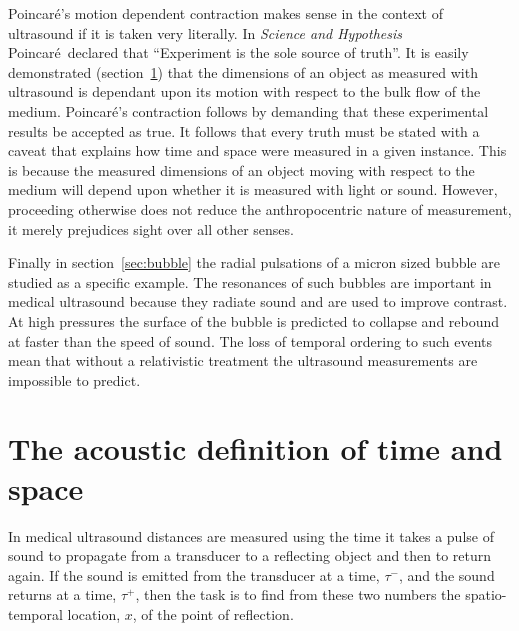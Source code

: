 \documentclass[10pt, fleqn,draft,showtrims,oldfontcommands]{article} %
\newcommand{\secref}[1]{section~\ref{sec:#1}}
\newcommand{\tm}{\tau^-}
\newcommand{\tp}{\tau^+}
\newcommand{\aetherial}{\ae therial}
\newcommand{\Poincare}{Poincar{\'e}}
\begin{document}
\Poincare's motion dependent contraction makes sense in the context of ultrasound if it is taken very literally.
In {\em Science and Hypothesis}\cite{Poincare1902} \Poincare\ declared that ``Experiment is the sole source of truth''.
It is easily demonstrated (\secref{measurement}) that the dimensions of an object as  measured with  ultrasound 
is dependant upon its motion with respect to the bulk flow of the medium.
\Poincare's contraction follows by  demanding that these experimental results be accepted as true.
It follows that  every truth  must be stated with a caveat that explains how time and space were  measured in a given instance.
This is because the measured dimensions of an object moving with respect to the medium  will depend upon whether it is measured with light or sound.
However, proceeding otherwise does not reduce the anthropocentric nature of measurement, it merely prejudices sight over all other senses.





Finally in section~\ref{sec:bubble} the radial pulsations of a micron sized bubble are studied as a specific example.
The resonances of such bubbles are important in medical ultrasound because they  radiate sound
and are used to improve contrast.
At high pressures the surface of the bubble is predicted to collapse and rebound at faster than the speed of sound.
The  loss of temporal ordering to such events mean that without a relativistic treatment the ultrasound measurements are impossible  to predict.


\section{The acoustic definition of time and space}\label{sec:measurement}


In medical ultrasound distances are measured using the time it takes a pulse of sound to propagate from a transducer
to a reflecting object and then to return again. 
If the sound is emitted from the transducer at a time, $\tm$,
and the sound returns at a time,  $\tp$,
then the task is to find from these two numbers the spatio-temporal location, $x$,
of the point of reflection.
\end{document}

